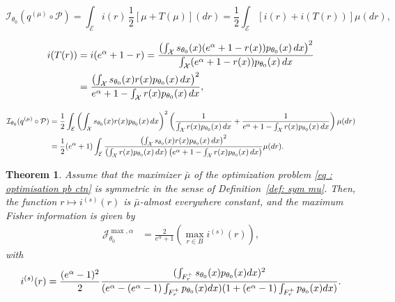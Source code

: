 \documentclass[10pt,a4paper]{amsart}
\newtheorem{thm}{Theorem}
\begin{document}
\begin{equation}\label{eq: fish step 1 3}
  \mathcal{I}_{\theta_0}(q^{(\mu)} \circ \mathcal{P}) = \int_\mathcal{E} i(r) \, \frac{1}{2}[\mu + T(\mu)](dr) = \frac{1}{2} \int_\mathcal{E} [i(r) + i(T(r))] \mu(dr),
\end{equation}

\begin{align}{\label{eq: i(T(r))}}
i(T(r)) &= i(e^\alpha + 1 - r) = \frac{\left( \int_\mathcal{X} s_{\theta_0}(x) (e^\alpha + 1 - r(x)) p_{\theta_0}(x) \, dx \right)^2}{\int_\mathcal{X} (e^\alpha + 1 - r(x)) p_{\theta_0}(x) \, dx} \\
&= \frac{\left( \int_\mathcal{X} s_{\theta_0}(x) r(x) p_{\theta_0}(x) \, dx \right)^2}{e^\alpha + 1 - \int_\mathcal{X} r(x) p_{\theta_0}(x) \, dx}, \nonumber
\end{align}

\begin{align}{\label{eq: 40.9}}
\mathcal{I}_{\theta_0}(q^{(\mu)} \circ \mathcal{P}) &= \frac{1}{2} \int_\mathcal{E} \left( \int_\mathcal{X} s_{\theta_0}(x) r(x) p_{\theta_0}(x) \, dx \right)^2 \left( \frac{1}{\int_\mathcal{X} r(x) p_{\theta_0}(x) \, dx} + \frac{1}{e^\alpha + 1 - \int_\mathcal{X} r(x) p_{\theta_0}(x) \, dx} \right) \mu(dr) \nonumber \\
&= \frac{1}{2}(e^\alpha + 1) \int_\mathcal{E} \frac{\left( \int_\mathcal{X} s_{\theta_0}(x) r(x) p_{\theta_0}(x) \, dx \right)^2}{\left( \int_\mathcal{X} r(x) p_{\theta_0}(x) \, dx \right) \left( e^\alpha + 1 - \int_\mathcal{X} r(x) p_{\theta_0}(x) \, dx \right)} \mu(dr).
\end{align}

\begin{thm}\label{thm: Fisher sym}
Assume that the maximizer $\bar{\mu}$ of the optimization problem \eqref{eq : optimisation pb ctn} is symmetric in the sense of Definition~\ref{def: sym mu}. Then, the function $r \mapsto i^{(s)}(r)$ is $\bar{\mu}$-almost everywhere constant, and the maximum Fisher information is given by
\begin{align*}
\mathcal{J}_{\theta_0}^{\max, \alpha} &= \frac{2}{e^\alpha + 1} (\max_{r \in B} i^{(s)}(r)), 
\end{align*}
with
\begin{equation}{\label{eq: i(s)r}}
i^{(s)}(r) = \frac{(e^\alpha - 1)^2}{2} \frac{(\int_{F_r^+}s_{\theta_0}(x)p_{\theta_0}(x) dx)^2}{(e^\alpha  -(e^\alpha - 1) \int_{F_r^+}p_{\theta_0}(x)dx)(1 + (e^\alpha - 1) \int_{F_r^+}p_{\theta_0}(x)dx)}.
\end{equation}
\end{thm}
\end{document}
